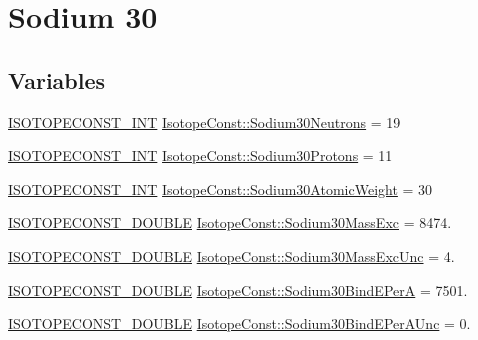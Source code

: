 \hypertarget{group___isotope_const-_sodium-_na30}{}\section{Sodium 30}
\label{group___isotope_const-_sodium-_na30}
\subsection*{Variables}
\begin{DoxyCompactItemize}
\item 
\mbox{\hyperlink{group___isotope_const-_macros_ga5f18360b3e99483a35c32d789e62621c}{I\+S\+O\+T\+O\+P\+E\+C\+O\+N\+S\+T\+\_\+\+I\+NT}} \mbox{\hyperlink{group___isotope_const-_sodium-_na30_ga105f81c19b64badfdec0b9cb6b7b830a}{Isotope\+Const\+::\+Sodium30\+Neutrons}} = 19
\item 
\mbox{\hyperlink{group___isotope_const-_macros_ga5f18360b3e99483a35c32d789e62621c}{I\+S\+O\+T\+O\+P\+E\+C\+O\+N\+S\+T\+\_\+\+I\+NT}} \mbox{\hyperlink{group___isotope_const-_sodium-_na30_ga626f84fc08b3429bf6dcc4e6fa73ea1f}{Isotope\+Const\+::\+Sodium30\+Protons}} = 11
\item 
\mbox{\hyperlink{group___isotope_const-_macros_ga5f18360b3e99483a35c32d789e62621c}{I\+S\+O\+T\+O\+P\+E\+C\+O\+N\+S\+T\+\_\+\+I\+NT}} \mbox{\hyperlink{group___isotope_const-_sodium-_na30_gaf4d45d90d2e2201f318c3cc170253a40}{Isotope\+Const\+::\+Sodium30\+Atomic\+Weight}} = 30
\item 
\mbox{\hyperlink{group___isotope_const-_macros_ga8f45a7272ce02c0b4c65c44636ed719a}{I\+S\+O\+T\+O\+P\+E\+C\+O\+N\+S\+T\+\_\+\+D\+O\+U\+B\+LE}} \mbox{\hyperlink{group___isotope_const-_sodium-_na30_ga371a56634549d45707e2012e98c8d7b4}{Isotope\+Const\+::\+Sodium30\+Mass\+Exc}} = 8474.
\item 
\mbox{\hyperlink{group___isotope_const-_macros_ga8f45a7272ce02c0b4c65c44636ed719a}{I\+S\+O\+T\+O\+P\+E\+C\+O\+N\+S\+T\+\_\+\+D\+O\+U\+B\+LE}} \mbox{\hyperlink{group___isotope_const-_sodium-_na30_ga6bcfaa9f4e5e1b5a3dd4bc30e3897590}{Isotope\+Const\+::\+Sodium30\+Mass\+Exc\+Unc}} = 4.
\item 
\mbox{\hyperlink{group___isotope_const-_macros_ga8f45a7272ce02c0b4c65c44636ed719a}{I\+S\+O\+T\+O\+P\+E\+C\+O\+N\+S\+T\+\_\+\+D\+O\+U\+B\+LE}} \mbox{\hyperlink{group___isotope_const-_sodium-_na30_gaff9dc0ef601a99efd6ea4b2d3eb2e22e}{Isotope\+Const\+::\+Sodium30\+Bind\+E\+PerA}} = 7501.
\item 
\mbox{\hyperlink{group___isotope_const-_macros_ga8f45a7272ce02c0b4c65c44636ed719a}{I\+S\+O\+T\+O\+P\+E\+C\+O\+N\+S\+T\+\_\+\+D\+O\+U\+B\+LE}} \mbox{\hyperlink{group___isotope_const-_sodium-_na30_ga37ee7b040e218eeda93d546ddd5db348}{Isotope\+Const\+::\+Sodium30\+Bind\+E\+Per\+A\+Unc}} = 0.

\end{DoxyCompactItemize}
